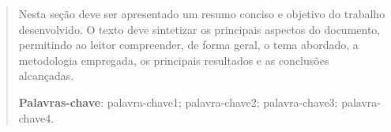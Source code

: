 \begin{abstract}
  \noindent Nesta seção deve ser apresentado um resumo conciso e objetivo do trabalho desenvolvido.
  O texto deve sintetizar os principais aspectos do documento, permitindo ao leitor compreender, de forma geral, o tema abordado, a metodologia empregada, os principais resultados e as conclusões alcançadas.

  \noindent
  \textbf{Palavras-chave}: palavra-chave1; palavra-chave2; palavra-chave3; palavra-chave4.
\end{abstract}

\newpage
